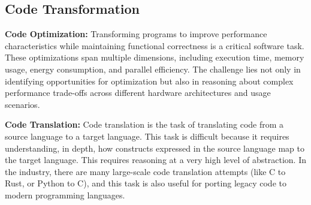 \vspace{-0.25cm}

\subsection{Code Transformation}

\vspace{-0.1cm}

\textbf{Code Optimization:} Transforming programs to improve performance characteristics while maintaining functional correctness is a critical software task.
% 
These optimizations span multiple dimensions, including execution time, memory usage, energy consumption, and parallel efficiency. 
The challenge lies not only in identifying opportunities for optimization but also in reasoning about complex performance trade-offs across different hardware architectures and usage scenarios. 
% 
% 


\textbf{Code Translation:} Code translation is the task of translating code from a source language to a target language. This task is difficult because it requires understanding, in depth, how constructs expressed in the source language map to the target language. This requires reasoning at a very high level of abstraction. In the industry, there are many large-scale code translation attempts (like C to Rust, or Python to C), and this task is also useful for porting legacy code to modern programming languages.


